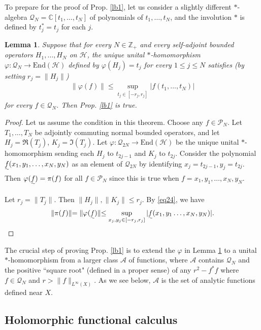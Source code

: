 \documentclass[12pt,b5paper,notitlepage]{article}
\theoremstyle{definition}
\theoremstyle{plain}
\newtheorem{lm}[df]{Lemma}
\newcommand{\mc}{\mathcal}
\newcommand{\End}{\mathrm{End}} %
\newcommand{\Cbb}{\mathbb C}
\newcommand{\Zbb}{\mathbb Z}
\numberwithin{equation}{section}
\begin{document}
To prepare for the proof of Prop. \ref{lb1}, let us consider a slightly different $*$-algebra $\mc Q_N=\Cbb[t_1,\dots,t_N]$ of polynomials of $t_1,\dots,t_N$, and the involution $*$ is defined by $t_j^*=t_j$ for each $j$. 

\begin{lm}\label{lb69}
Suppose that for every $N\in\Zbb_+$ and every self-adjoint bounded operators $H_1,\dots,H_N$ on $\mc H$, the unique unital $*$-homomorphism $\varphi:\mc Q_N\rightarrow\End(\mc H)$ defined by $\varphi(H_j)=t_j$ for every $1\leq j\leq N$ satisfies (by setting $r_j=\lVert H_j\lVert$)
\begin{align}
\lVert \varphi(f)\lVert \leq\sup_{t_j\in[-r_j,r_j]}|f(t_1,\dots,t_N)|\label{eq24}
\end{align}
for every $f\in\mc Q_N$. Then Prop. \ref{lb1} is true.
\end{lm}

\begin{proof}
Let us assume the condition in this theorem. Choose any $f\in\mc P_N$. Let $T_1,\dots,T_N$ be adjointly commuting normal bounded operators, and let $H_j=\Re(T_j)$, $K_j=\Im(T_j)$. Let $\varphi:\mc Q_{2N}\rightarrow\End(\mc H)$ be the unique unital $*$-homomorphism sending each $H_j$ to $t_{2j-1}$ and $K_j$ to $t_{2j}$. Consider the polynomial $\uwave f(x_1,y_1,\dots,x_N,y_N)$ as an element of $\mc Q_{2N}$ by identifying $x_j=t_{2j-1},y_j=t_{2j}$. Then $\varphi(\uwave f)=\pi(f)$ for all $f\in\mc P_N$ since this is true when $f=x_1,y_1,\dots,x_N,y_N$.

Let $r_j=\lVert T_j\lVert$. Then $\lVert H_j\lVert,\lVert K_j\lVert\leq r_j$. By \eqref{eq24}, we have
\begin{align*}
\lVert\pi(f)\lVert=\lVert \varphi(\uwave f)\lVert \leq\sup_{x_j,y_j\in[-r_j,r_j]}|\uwave f(x_1,y_1\dots,x_N,y_N)|.	
\end{align*}
\end{proof}



The crucial step of proving Prop. \ref{lb1} is to extend the $\varphi$ in Lemma \ref{lb69} to a unital $*$-homomorphism from a larger class $\mc A$ of functions, where $\mc A$ contains  $\mc Q_N$ and the positive ``square root" (defined in a proper sense) of any $r^2-f^*f$ where $f\in\mc Q_N$ and $r>\lVert f\lVert_{L^\infty(X)}$. As we see below, $\mc A$ is the set of analytic functions defined near $X$.

\subsection*{Holomorphic functional calculus}
\end{document}
